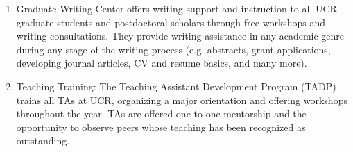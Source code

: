 \documentclass[12pt]{article}
\begin{document}
\begin{enumerate}
\item Graduate Writing Center offers writing support and instruction
  to all UCR graduate students and postdoctoral scholars through free
  workshops and writing consultations. They provide writing assistance
  in any academic genre during any stage of the writing process
  (e.g. abstracts, grant applications, developing journal articles, CV
  and resume basics, and many more).

\item Teaching Training:  The Teaching Assistant Development Program
  (TADP) trains all TAs at UCR, organizing a major orientation and
  offering workshops throughout the year. TAs are offered one-to-one
  mentorship and the opportunity to observe peers whose teaching has
  been recognized as outstanding.

\end{enumerate}
\end{document}
